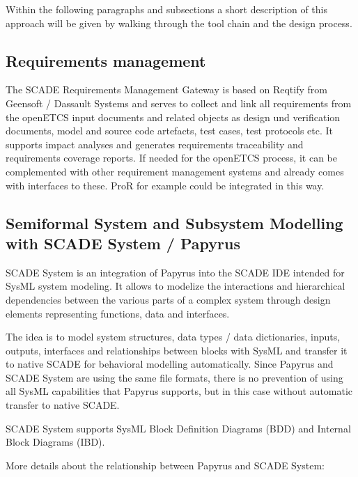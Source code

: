 Within the following paragraphs and subsections a short description of this approach will be given by walking through the tool chain and the design process. 

\subsection{Requirements management}
\label{sec:RequirementsManagement}

The SCADE Requirements Management Gateway is based on Reqtify from Geensoft / Dassault Systems and serves to collect and link all requirements from the openETCS input documents and related objects as design und verification documents, model and source code artefacts, test cases, test protocols etc. It supports impact analyses and generates requirements traceability and requirements coverage reports. 
If needed for the openETCS process, it can be complemented with other requirement management systems and already comes with interfaces to these. ProR for example could be integrated in this way. 


\subsection{Semiformal System and Subsystem Modelling with SCADE System / Papyrus}
\label{sec:SemiformalModelling}

SCADE System is an integration of Papyrus into the SCADE IDE intended for SysML system modeling. It allows to modelize the interactions and hierarchical dependencies between the various parts of a complex system through design elements representing functions, data and interfaces. 
 
The idea is to model system structures, data types / data dictionaries, inputs, outputs, interfaces and relationships between blocks with SysML and transfer it to native SCADE for behavioral modelling automatically. Since Papyrus and SCADE System are using the same file formats, there is no prevention of using all SysML capabilities that Papyrus supports, but in this case without automatic transfer to native SCADE. 

SCADE System supports SysML Block Definition Diagrams (BDD) and	Internal Block Diagrams (IBD).

More details about the relationship between Papyrus and SCADE System: 

